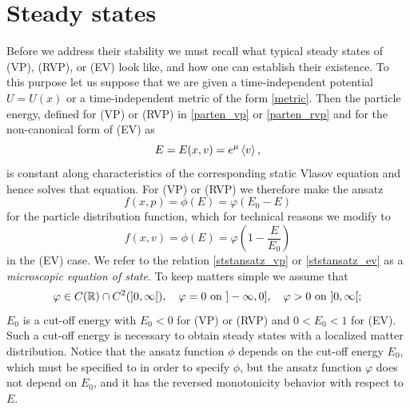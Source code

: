 \documentclass[11pt]{article}
\begin{document}
\section{Steady states}
\label{stst}
\setcounter{equation}{0}
%
%
Before we address their stability we must recall what typical steady states
of (VP), (RVP), or (EV) look like, and how one can establish their existence.
To this purpose let us suppose that we are given a time-independent
potential $U=U(x)$ or a time-independent metric of the form \eqref{metric}.
Then the particle energy, defined for (VP) or (RVP) in \eqref{parten_vp} or
\eqref{parten_rvp} and for the non-canonical form of (EV) as
\begin{equation}\label{parten_evv}
  E=E(x,v) = e^{\mu}\left\langle v\right\rangle,
\end{equation}
is constant along characteristics of the corresponding static Vlasov equation
and hence solves that equation. For (VP) or (RVP) we therefore make the ansatz
\begin{equation}\label{ststansatz_vp}
  f(x,p) = \phi(E) = \varphi(E_0 -E)
\end{equation}
for the particle distribution function, which for technical reasons we modify
to
\begin{equation}\label{ststansatz_ev}
  f(x,v) = \phi(E) = \varphi\left(1 -\frac{E}{E_0}\right)
\end{equation}
in the (EV) case. We refer to the relation \eqref{ststansatz_vp}
or \eqref{ststansatz_ev} as a {\em microscopic equation of state}.
To keep matters simple we assume that
\begin{equation}\label{phicond0}
  \varphi\in C(\mathbb R) \cap C^2(]0,\infty[),\quad
  \varphi=0\  \mbox{on}\ ]-\infty,0],\quad
  \varphi>0\ \mbox{on}\ ]0,\infty[;
\end{equation}
$E_0$ is a cut-off energy with $E_0<0$ for (VP)
or (RVP) and $0<E_0<1$ for (EV). Such a cut-off energy is necessary to
obtain steady states with a localized matter distribution.
Notice that the ansatz function $\phi$ depends on the
cut-off energy $E_0$, which must be specified to in order to specify $\phi$,
but the ansatz function $\varphi$ does not depend on $E_0$, and it has the
reversed monotonicity behavior with respect to $E$.
\end{document}
